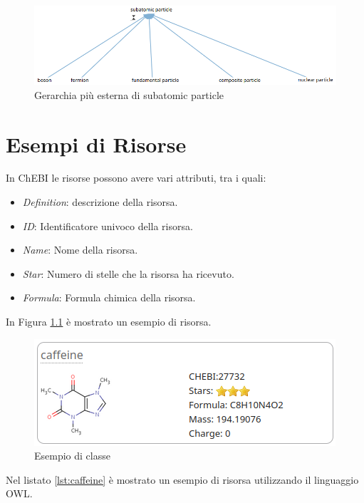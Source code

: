 \documentclass[12pt,a4paper,openright,twoside]{book}
\begin{document}
\begin{figure}[H]
	\centering
	\includegraphics[width=\linewidth]{figures/subatomic-particle.png}
	\caption{Gerarchia più esterna di subatomic particle}
	\label{fig:SubatomicParticle}
\end{figure}

\chapter{Esempi di Risorse}
\label{chap:classexamples}

In ChEBI le risorse possono avere vari attributi, tra i quali:
\begin{itemize}
	\item \textit{Definition}: descrizione della risorsa.
	\item \textit{ID}: Identificatore univoco della risorsa.
	\item \textit{Name}: Nome della risorsa.
	\item \textit{Star}: Numero di stelle che la risorsa ha ricevuto.
	\item \textit{Formula}: Formula chimica della risorsa.
\end{itemize}

In Figura \ref{fig:Class} è mostrato un esempio di risorsa.

\begin{figure}[H]
	\centering
	\includegraphics[width=\linewidth]{figures/class.png}
	\caption{Esempio di classe}
	\label{fig:Class}
\end{figure}

Nel listato \ref{lst:caffeine} è mostrato un esempio di risorsa utilizzando il linguaggio OWL.
\end{document}
